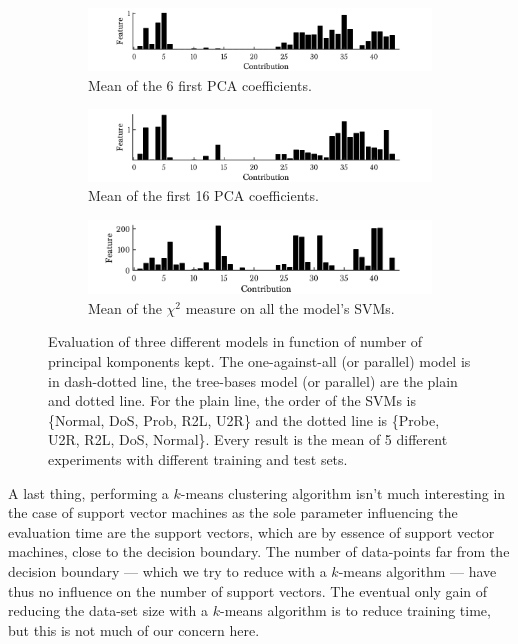 \begin{figure}
        \begin{subfigure}[b]{1\textwidth}  
            \centering 
            \includegraphics[width=.98\textwidth]{parts/chap-4/img-svm/pca-features-3.png}
            \caption{Mean of the 6 first PCA coefficients.} 
        \end{subfigure}
        \vfill
        \begin{subfigure}[b]{1\textwidth}   
            \centering 
            \includegraphics[width=.98\textwidth]{parts/chap-4/img-svm/pca-features-3-bis.png}
            \caption{Mean of the first 16 PCA coefficients.} 
        \end{subfigure}
        \vfill
        \begin{subfigure}[b]{1\textwidth}   
            \centering 
            \includegraphics[width=.98\textwidth]{parts/chap-4/img-svm/chi2-features.png}
            \caption{Mean of the $\chi^2$ measure on all the model's SVMs.} 
        \end{subfigure}
        \caption{Evaluation of three different models in function of number of principal komponents kept. The one-against-all (or parallel) model is in dash-dotted line, the tree-bases model (or parallel) are the plain and dotted line. For the plain line, the order of the SVMs is \{Normal, DoS, Prob, R2L, U2R\} and the dotted line is \{Probe, U2R, R2L, DoS, Normal\}. Every result is the mean of 5 different experiments with different training and test sets.}
        \label{fig:features-part}
\end{figure}

A last thing, performing a $k$-means clustering algorithm isn't much interesting in the case of support vector machines as the sole parameter influencing the evaluation time are the support vectors, which are by essence of support vector machines, close to the decision boundary. The number of data-points far from the decision boundary --- which we try to reduce with a $k$-means algorithm --- have thus no influence on the number of support vectors. The eventual only gain of reducing the data-set size with a $k$-means algorithm is to reduce training time, but this is not much of our concern here.

